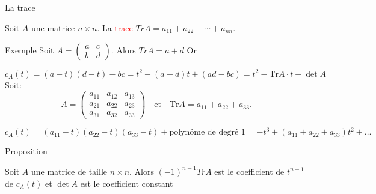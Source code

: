 \begin{parag}{La trace}
    \begin{definition}
        Soit $A$ une matrice $n \times n$. La \textcolor{red}{trace} $Tr A = a_{11} + a_{22} + \cdots + a_{nn}$.
    \end{definition}
    \begin{subparag}{Exemple}
        Soit $A = \begin{pmatrix}
            a & c \\ b & d
        \end{pmatrix}$. Alors $TrA = a + d$ Or

  \[
c_A(t) = (a - t)(d - t) - bc = t^2 - (a + d)t + (ad - bc) = t^2 - \text{Tr}A \cdot t + \det A
\]
Soit:
\[
A = 
\begin{pmatrix}
a_{11} & a_{12} & a_{13} \\
a_{21} & a_{22} & a_{23} \\
a_{31} & a_{32} & a_{33}
\end{pmatrix}
\quad \text{et} \quad \text{Tr}A = a_{11} + a_{22} + a_{33}.
\]

\[
c_A(t) = (a_{11} - t)(a_{22} - t)(a_{33} - t) + \text{polynôme de degré 1}
= -t^3 + (a_{11} + a_{22} + a_{33})t^2 + \dots
\]
    \end{subparag}
    \begin{subparag}{Proposition}
        \begin{theoreme}
            Soit $A$ une matrice de taille $n \times n$. Alors $(-1)^{n-1}TrA$ est le coefficient de $t^{n-1}$ de $c_A(t)$ et $\det A$ est le coefficient constant
        \end{theoreme}


\end{subparag}
\end{parag}
